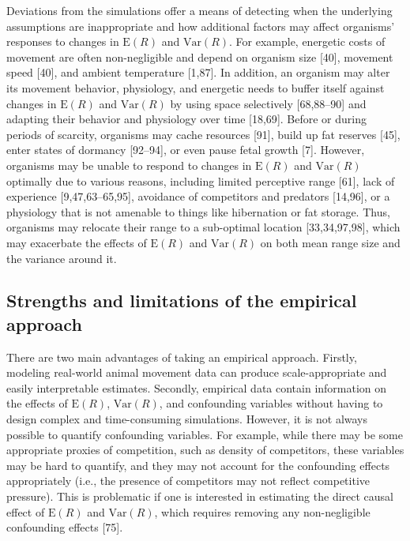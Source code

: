 \documentclass[
  12pt,
]{article}
\begin{document}
Deviations from the simulations offer a means of detecting when the underlying assumptions are inappropriate and how additional factors may affect organisms' responses to changes in \(\text{E}(R)\) and \(\text{Var}(R)\). For example, energetic costs of movement are often non-negligible and depend on organism size {[}40{]}, movement speed {[}40{]}, and ambient temperature {[}1,87{]}. In addition, an organism may alter its movement behavior, physiology, and energetic needs to buffer itself against changes in \(\text{E}(R)\) and \(\text{Var}(R)\) by using space selectively {[}68,88--90{]} and adapting their behavior and physiology over time {[}18,69{]}. Before or during periods of scarcity, organisms may cache resources {[}91{]}, build up fat reserves {[}45{]}, enter states of dormancy {[}92--94{]}, or even pause fetal growth {[}7{]}. However, organisms may be unable to respond to changes in \(\text{E}(R)\) and \(\text{Var}(R)\) optimally due to various reasons, including limited perceptive range {[}61{]}, lack of experience {[}9,47,63--65,95{]}, avoidance of competitors and predators {[}14,96{]}, or a physiology that is not amenable to things like hibernation or fat storage. Thus, organisms may relocate their range to a sub-optimal location {[}33,34,97,98{]}, which may exacerbate the effects of \(\text{E}(R)\) and \(\text{Var}(R)\) on both mean range size and the variance around it.

\subsection{Strengths and limitations of the empirical approach}\label{strengths-and-limitations-of-the-empirical-approach}

\noindent There are two main advantages of taking an empirical approach. Firstly, modeling real-world animal movement data can produce scale-appropriate and easily interpretable estimates. Secondly, empirical data contain information on the effects of \(\text{E}(R)\), \(\text{Var}(R)\), and confounding variables without having to design complex and time-consuming simulations. However, it is not always possible to quantify confounding variables. For example, while there may be some appropriate proxies of competition, such as density of competitors, these variables may be hard to quantify, and they may not account for the confounding effects appropriately (i.e., the presence of competitors may not reflect competitive pressure). This is problematic if one is interested in estimating the direct causal effect of \(\text{E}(R)\) and \(\text{Var}(R)\), which requires removing any non-negligible confounding effects {[}75{]}.
\end{document}
